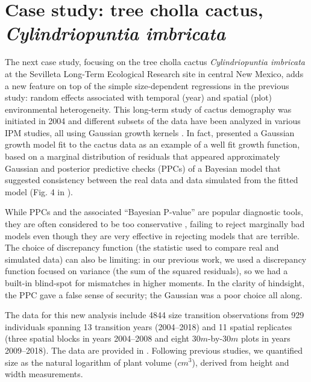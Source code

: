 \documentclass[12pt]{article}
\begin{document}
\section{Case study: tree cholla cactus, \emph{Cylindriopuntia imbricata}}
The next case study, focusing on the tree cholla cactus \emph{Cylindriopuntia imbricata} at the Sevilleta Long-Term Ecological Research site in central New Mexico, adds a new feature on top of the simple size-dependent regressions in the previous study: random effects associated with temporal (year) and spatial (plot) environmental heterogeneity. 
This long-term study of cactus demography was initiated in 2004 and different subsets of the data have been analyzed in various IPM studies, all using Gaussian growth kernels  \citep{miller2009impacts,czachurademographic,compagnoni2016effect,ohm2014balancing,elderd2016quantifying}.
In fact, \citep{elderd2016quantifying} presented a Gaussian growth model fit to the cactus data as an example of a well fit growth function, based on a marginal distribution of residuals that appeared approximately Gaussian and posterior predictive checks (PPCs) of a Bayesian model that suggested consistency between the real data and data simulated from the fitted model (Fig. 4 in \citep{elderd2016quantifying}). 

While PPCs and the associated ``Bayesian P-value'' are popular diagnostic tools, they are often considered to be too conservative \citep{conn2018guide,zhang2014comparative}, failing to reject marginally bad models even though they are very effective in rejecting models that are terrible.
The choice of discrepancy function (the statistic used to compare real and simulated data) can also be limiting: in our previous work, we used a discrepancy function focused on variance (the sum of the squared residuals), so we had a built-in blind-spot for mismatches in higher moments.
In the clarity of hindsight, the PPC gave a false sense of security; the Gaussian was a poor choice all along.

The data for this new analysis include 4844 size transition observations from 929 individuals spanning 13 transition years (2004--2018) and 11 spatial replicates (three spatial blocks in years 2004--2008 and eight $30m$-by-$30m$ plots in years 2009--2018). 
The data are provided in \cite{cactusdata}.
Following previous studies, we quantified size as the natural logarithm of plant volume ($cm^3$), derived from height and width measurements. 
\end{document}
